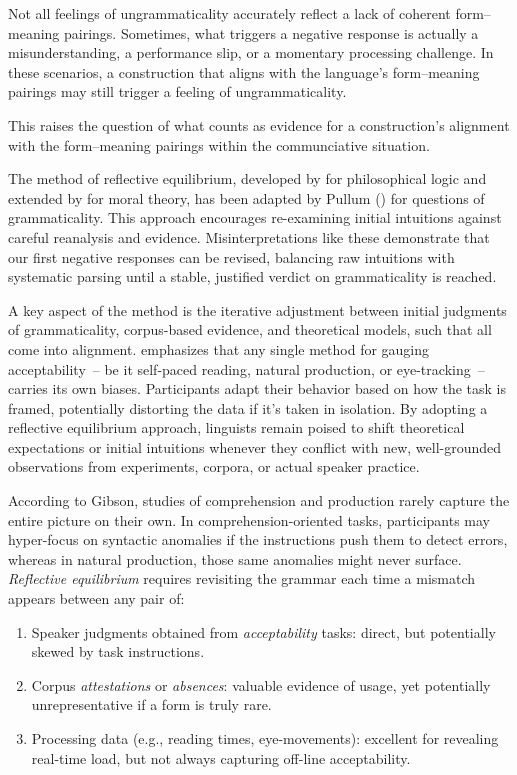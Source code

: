 \documentclass[12pt,letterpaper]{article}
\begin{document}
Not all feelings of ungrammaticality accurately reflect a lack of coherent form--meaning pairings. Sometimes, what triggers a negative response is actually a misunderstanding, a performance slip, or a momentary processing challenge. In these scenarios, a construction that aligns with the language's form--meaning pairings may still trigger a feeling of ungrammaticality.

This raises the question of what counts as evidence for a construction's alignment with the form--meaning pairings within the communciative situation.

The method of reflective equilibrium, developed by \textcite{Goodman1955} for philosophical logic and extended by \textcite{Rawls1971} for moral theory, has been adapted by Pullum (\citeyear{Pullum2017}) for questions of grammaticality. This approach encourages re-examining initial intuitions against careful reanalysis and evidence. Misinterpretations like these demonstrate that our first negative responses can be revised, balancing raw intuitions with systematic parsing until a stable, justified verdict on grammaticality is reached.

A key aspect of the method is the iterative adjustment between initial judgments of grammaticality, corpus-based evidence, and theoretical models, such that all come into alignment. \textcite{Gibson2024} emphasizes that any single method for gauging acceptability~-- be it self-paced reading, natural production, or eye-tracking~-- carries its own biases. Participants adapt their behavior based on how the task is framed, potentially distorting the data if it's taken in isolation. By adopting a reflective equilibrium approach, linguists remain poised to shift theoretical expectations or initial intuitions whenever they conflict with new, well-grounded observations from experiments, corpora, or actual speaker practice.

According to Gibson, studies of comprehension and production rarely capture the entire picture on their own. In comprehension-oriented tasks, participants may hyper-focus on syntactic anomalies if the instructions push them to detect errors, whereas in natural production, those same anomalies might never surface. \textit{Reflective equilibrium} requires revisiting the grammar each time a mismatch appears between any pair of:
\begin{enumerate}
    \item Speaker judgments obtained from \textit{acceptability} tasks: direct, but potentially skewed by task instructions.
    \item Corpus \textit{attestations} or \textit{absences}: valuable evidence of usage, yet potentially unrepresentative if a form is truly rare.
    \item Processing data (e.g., reading times, eye-movements): excellent for revealing real-time load, but not always capturing off-line acceptability.
\end{enumerate}
\end{document}
